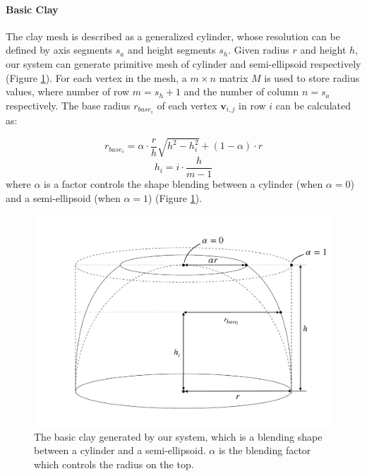 \documentclass{svjour3}                     %
\begin{document}
\paragraph{Basic Clay} The clay mesh is described as a generalized cylinder, whose resolution can be defined by axis segments $s_{a}$ and height segments $s_{h}$. Given radius $r$ and height $h$, our system can generate primitive mesh of cylinder and semi-ellipsoid respectively (Figure \ref{fig:base}).
For each vertex in the mesh, a $m \times n$ matrix $M$ is used to store radius values, where number of row $m = s_{h} + 1$ and the number of column $n = s_{a}$ respectively. The base radius $r_{base_{i}}$ of each vertex $\mathbf{v}_{i,j}$ in row $i$ can be calculated as: 

\begin{equation}
r_{base_{i}} = \alpha \cdot \frac{r}{h} \sqrt{h^2 -  h_{i}^2} + (1 - \alpha) \cdot r
\end{equation}
\begin{equation}
h_{i} = i \cdot \frac{h}{m-1}
\end{equation}
where $\alpha$ is a factor controls the shape blending between a  cylinder (when $\alpha=0$) and a semi-ellipsoid (when $\alpha=1$) (Figure \ref{fig:base}).

\begin{figure}
\includegraphics[width=\textwidth]{fig4.pdf}
\caption{The basic clay generated by our system, which is a blending shape between a cylinder and a semi-ellipsoid. $\alpha$ is the blending factor which controls the radius on the top.}
\label{fig:base}
\end{figure}
\end{document}
